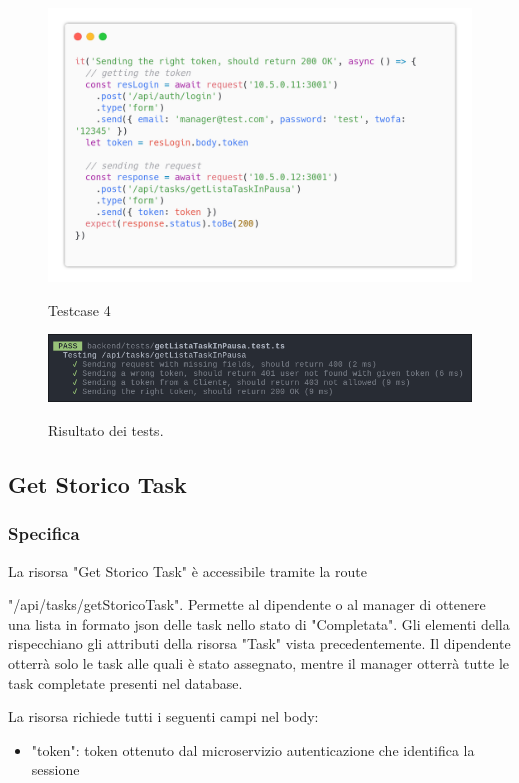 \documentclass{report}
\begin{document}
\begin{figure}[H]
	\centering\includegraphics[width=1\textwidth]{images/code_in_pausa_test4.png}
	
	Testcase 4
\end{figure}

\begin{figure}[H]
	\centering\includegraphics[width=1\textwidth]{images/jest_in_pausa.png}
	
	Risultato dei tests.
\end{figure}

\subsection{Get Storico Task}
\subsubsection*{Specifica}

La risorsa "Get Storico Task" è accessibile tramite la route

"/api/tasks/getStoricoTask". Permette al dipendente o al manager di ottenere una lista in formato json delle task nello stato di "Completata". Gli elementi della rispecchiano gli attributi della risorsa "Task" vista precedentemente.
Il dipendente otterrà solo le task alle quali è stato assegnato, mentre il manager otterrà tutte le task completate presenti nel database.

La risorsa richiede tutti i seguenti campi nel body:
\begin{itemize}
	\item "token": token ottenuto dal microservizio autenticazione che identifica la sessione
\end{itemize}
\end{document}

